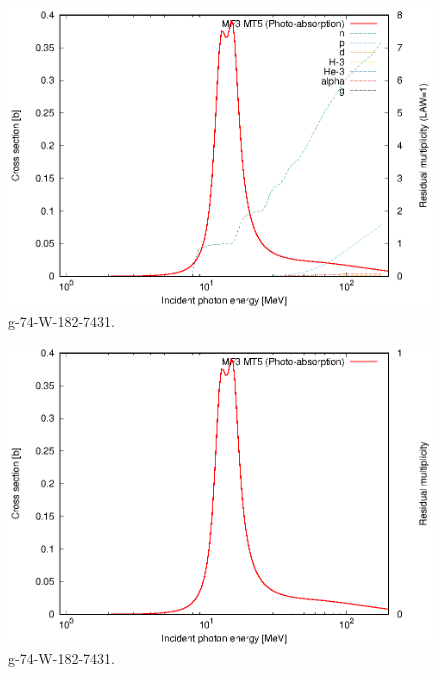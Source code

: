 \begin{figure}
 \includegraphics[width=\linewidth]{eps/g_74-W-182_7431.eps}
  \caption{g-74-W-182-7431.}
\end{figure}
\begin{figure}
 \includegraphics[width=\linewidth]{eps-law0/g_74-W-182_7431.eps}
 \caption{g-74-W-182-7431.}
\end{figure}
\newpage \clearpage

